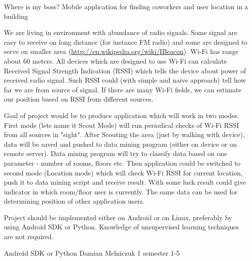 \begin{project}
{Where is my boss?}
{Mobile application for finding coworkers and user location in a building} 
{ 
We are living in environment with abundance of radio signals. Some signal are easy to receive on long distance
(for instance FM radio) and some are designed to serve on smaller area
(\url{http://en.wikipedia.org/wiki/IBeacon}).
Wi-Fi has range about 60 meters. All devices which are designed to use Wi-Fi can calculate Received Signal 
Strength Indication (RSSI) which tells the device about power of received radio signal. Such RSSI could
(with simple and naive approach) tell how far we are from source of signal. If
there are many Wi-Fi fields, we can estimate our position based on RSSI from different sources.\newline

Goal of project would be to produce application which will work in two modes.
First mode (lets name it Scout Mode) will run periodical checks of Wi-Fi RSSI from all sources in "sight".
After Scouting the area (just by walking with device), data will be saved and pushed to data mining program
(either on device or on remote server). Data mining program will try to classify data based on one parameter - 
number of rooms, floors etc. Then application could be switched to second mode (Location mode) which will 
check Wi-Fi RSSI for current location, push it to data mining script and receive result. With some luck result
could give indicator in which room/floor user is currently. The same
data can be used for determining position of other application users.\newline

Project should be implemented either on Android or on Linux, preferably by using
Android SDK or Python. Knowledge of unsupervised learning techniques are not required. 
}
{Android SDK or Python}
{Damian Melniczuk}
{1 semester}
{1-5}
\end{project}
